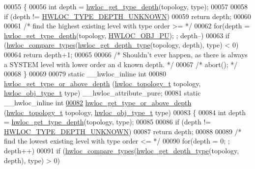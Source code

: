 \begin{DoxyCode}
00055 \{
00056   \textcolor{keywordtype}{int} depth = \hyperlink{a00046_gaea7c64dd59467f5201ba87712710b14d}{hwloc_get_type_depth}(topology, type);
00057 
00058   \textcolor{keywordflow}{if} (depth != \hyperlink{a00046_ggaf4e663cf42bbe20756b849c6293ef575a0565ab92ab72cb0cec91e23003294aad}{HWLOC_TYPE_DEPTH_UNKNOWN})
00059     \textcolor{keywordflow}{return} depth;
00060 
00061   \textcolor{comment}{/* find the highest existing level with type order >= */}
00062   \textcolor{keywordflow}{for}(depth = \hyperlink{a00046_gaea7c64dd59467f5201ba87712710b14d}{hwloc_get_type_depth}(topology, \hyperlink{a00041_ggacd37bb612667dc437d66bfb175a8dc55abca6887e80cb291353b0a0c1da83f661}{HWLOC_OBJ_PU}); ; depth--)
00063     \textcolor{keywordflow}{if} (\hyperlink{a00041_gabd7da4f4ea12b420b8ecbde458b27805}{hwloc_compare_types}(\hyperlink{a00046_gadd4964764ae7e49231065d58a553fd31}{hwloc_get_depth_type}(topology, depth), type) < 0)
00064       \textcolor{keywordflow}{return} depth+1;
00065 
00066   \textcolor{comment}{/* Shouldn't ever happen, as there is always a SYSTEM level with lower order an
      d known depth.  */}
00067   \textcolor{comment}{/* abort(); */}
00068 \}
00069 
00079 \textcolor{keyword}{static} \_\_hwloc\_inline \textcolor{keywordtype}{int}
00080 \hyperlink{a00052_ga62a3f401854c209605c90079700f4bc5}{hwloc_get_type_or_above_depth} (\hyperlink{a00039_ga9d1e76ee15a7dee158b786c30b6a6e38}{hwloc_topology_t} topology, \hyperlink{a00041_gacd37bb612667dc437d66bfb175a8dc55}{hwloc_obj_type_t} type) 
      \_\_hwloc\_attribute\_pure;
00081 \textcolor{keyword}{static} \_\_hwloc\_inline \textcolor{keywordtype}{int}
\hypertarget{a00031_source_l00082}{}\hyperlink{a00052_ga62a3f401854c209605c90079700f4bc5}{00082} \hyperlink{a00052_ga62a3f401854c209605c90079700f4bc5}{hwloc_get_type_or_above_depth} (\hyperlink{a00039_ga9d1e76ee15a7dee158b786c30b6a6e38}{hwloc_topology_t} topology, \hyperlink{a00041_gacd37bb612667dc437d66bfb175a8dc55}{hwloc_obj_type_t} type)
00083 \{
00084   \textcolor{keywordtype}{int} depth = \hyperlink{a00046_gaea7c64dd59467f5201ba87712710b14d}{hwloc_get_type_depth}(topology, type);
00085 
00086   \textcolor{keywordflow}{if} (depth != \hyperlink{a00046_ggaf4e663cf42bbe20756b849c6293ef575a0565ab92ab72cb0cec91e23003294aad}{HWLOC_TYPE_DEPTH_UNKNOWN})
00087     \textcolor{keywordflow}{return} depth;
00088 
00089   \textcolor{comment}{/* find the lowest existing level with type order <= */}
00090   \textcolor{keywordflow}{for}(depth = 0; ; depth++)
00091     \textcolor{keywordflow}{if} (\hyperlink{a00041_gabd7da4f4ea12b420b8ecbde458b27805}{hwloc_compare_types}(\hyperlink{a00046_gadd4964764ae7e49231065d58a553fd31}{hwloc_get_depth_type}(topology, depth), type) > 0)

\end{DoxyCode}
